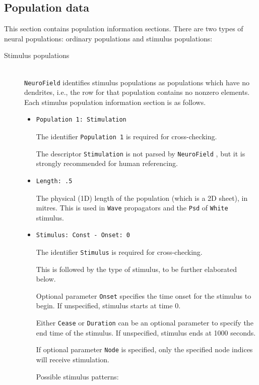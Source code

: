 \documentclass[12pt,a4paper]{article}
\newcommand{\type}[1]{ {\small\small\tt #1} }
\newcommand{\NF}[0]{ \type{NeuroField}}
\begin{document}
\subsection{Population data}
\label{sec:pop}
This section contains population information sections. There are two types of neural populations: ordinary populations and stimulus populations:
\begin{description}

\item[Stimulus populations]\ \\

\NF identifies stimulus populations as populations which have no dendrites, i.e., the row for that population contains no nonzero elements.  Each stimulus population information section is as follows.
\begin{itemize}
	\item \begin{lstlisting}
Population 1: Stimulation
	\end{lstlisting}
	The identifier \type{Population 1} is required for cross-checking.

	The descriptor \type{Stimulation} is not parsed by \NF, but it is strongly recommended for human referencing.
	\item
	\begin{lstlisting}
Length: .5
	\end{lstlisting}
	The physical (1D) length of the population (which is a 2D sheet), in mitres. This is used in \type{Wave} propagators and the \type{Psd} of \type{White} stimulus.
	\item
	\begin{lstlisting}
Stimulus: Const - Onset: 0
	\end{lstlisting}
	The identifier \type{Stimulus} is required for cross-checking.

	This is followed by the type of stimulus, to be further elaborated below.

	Optional parameter \type{Onset} specifies the time onset for the stimulus to begin. If unspecified, stimulus starts at time 0.

	Either \type{Cease} or \type{Duration} can be an optional parameter to specify the end time of the stimulus. If unspecified, stimulus ends at 1000 seconds.

	If optional parameter \type{Node} is specified, only the specified node indices will receive stimulation.

	Possible stimulus patterns:


\end{itemize}
\end{description}
\end{document}
